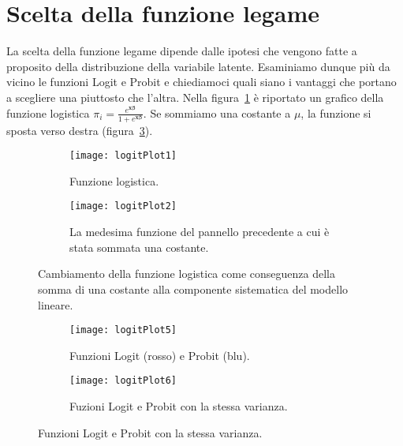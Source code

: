 \section{Scelta della funzione legame}

La scelta della funzione legame dipende  dalle ipotesi che vengono fatte a proposito della distribuzione della variabile latente. Esaminiamo dunque pi\`u da vicino le funzioni Logit e Probit e chiediamoci quali siano i vantaggi che portano a scegliere una piuttosto che l'altra.
Nella figura~\ref{fig:logitPlot1} è riportato un grafico della funzione logistica
$
\pi_i =
\frac{e^{\boldsymbol{x}\boldsymbol{\beta}}}{1+e^{\boldsymbol{x}\boldsymbol{\beta}}}.
$
Se sommiamo una costante a $\mu$, la funzione si sposta verso destra (figura~\ref{fig:logitPlot2}).

\begin{figure}[h!]
    \centering
    \begin{subfigure}[t]{0.45\textwidth}
        \centering
        \texttt{[image: logitPlot1]} 
        \caption{Funzione logistica.} \label{fig:logitPlot1}
    \end{subfigure}
    \hfill
    \begin{subfigure}[t]{0.45\textwidth}
        \centering
        \texttt{[image: logitPlot2]} 
        \caption{La medesima funzione del pannello precedente a cui è stata sommata una costante.} \label{fig:logitPlot2}
    \end{subfigure}
    \caption{Cambiamento della funzione logistica come conseguenza della somma di una costante alla componente sistematica del modello lineare.}
\end{figure}

\begin{figure}[h!]
    \centering
    \begin{subfigure}[t]{0.45\textwidth}
        \centering
        \texttt{[image: logitPlot5]} 
        \caption{Funzioni Logit (rosso) e Probit (blu).} \label{fig:logitPlot5}
    \end{subfigure}
    \hfill
    \begin{subfigure}[t]{0.45\textwidth}
        \centering
        \texttt{[image: logitPlot6]} 
        \caption{Fuzioni Logit e Probit con la stessa varianza.} \label{fig:logitPlot6}
    \end{subfigure}
    \caption{Funzioni Logit e Probit con la stessa varianza.}
\end{figure}

